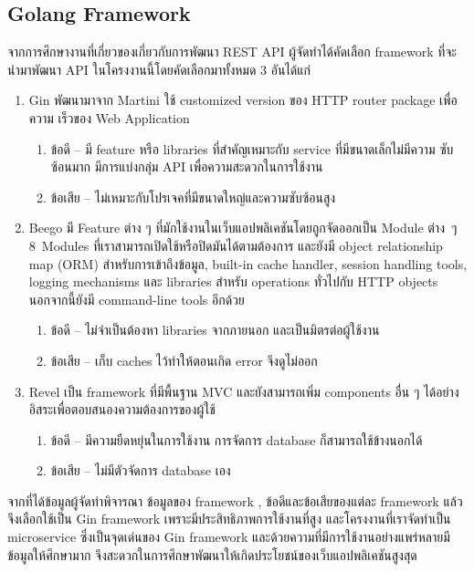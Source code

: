 \subsection{Golang Framework}
    จากการศึกษางานที่เกี่ยวของเกี่ยวกับการพัฒนา REST API ผู้จัดทำได้คัดเลือก 
framework ที่จะนำมาพัฒนา API ในโครงงานนี้โดยคัดเลือกมาทั้งหมด 3 อันได้แก่
\begin{enumerate}
    \item Gin พัฒนามาจาก Martini ใช้ customized version ของ HTTP router package 
เพื่อความ เร็วของ Web Application
        \begin{enumerate}
            \item ข้อดี – มี feature หรือ libraries ที่สำคัญเหมาะกับ service ที่มีขนาดเล็กไม่มีความ
ซับซ้อนมาก มีการแบ่งกลุ่ม API เพื่อความสะดวกในการใช้งาน
            \item ข้อเสีย – ไม่เหมาะกับโปรเจคที่มีขนาดใหญ่และความซับซ้อนสูง
        \end{enumerate}
        
    \item Beego มี Feature ต่าง ๆ ที่มักใช้งานในเว็บแอปพลิเคชันโดยถูกจัดออกเป็น 
Module \mbox{ต่าง ๆ} \mbox{8 Modules} ที่เราสามารถเปิดใช้หรือปิดมันได้ตามต้องการ และยังมี object relationship map (ORM) สำหรับการเข้าถึงข้อมูล, built-in cache handler, session handling tools, logging mechanisms และ libraries สำหรับ operations ทั่วไปกับ HTTP 
objects นอกจากนี้ยังมี command-line tools อีกด้วย
        \begin{enumerate}
            \item ข้อดี – ไม่จำเป็นต้องหา libraries จากภายนอก และเป็นมิตรต่อผู้ใช้งาน
            \item ข้อเสีย – เก็บ caches ไว้ทำให้ตอนเกิด error จึงดูไม่ออก
        \end{enumerate}

    \item Revel เป็น framework ที่มีพื้นฐาน MVC และยังสามารถเพิ่ม components อื่น ๆ 
ได้อย่างอิสระเพื่อตอบสนองความต้องการของผู้ใช้
        \begin{enumerate}
            \item ข้อดี – มีความยืดหยุ่นในการใช้งาน การจัดการ database ก็สามารถใช้ข้างนอกได้
            \item ข้อเสีย – ไม่มีตัวจัดการ database เอง
        \end{enumerate}
\end{enumerate}
จากที่ได้ข้อมูลผู้จัดทำพิจารณา ข้อมูลของ framework , ข้อดีและข้อเสียของแต่ละ framework แล้ว จึงเลือกใช้เป็น Gin framework เพราะมีประสิทธิภาพการใช้งานที่สูง และโครงงานที่เราจัดทำเป็น microservice ซึ่งเป็นจุดเด่นของ Gin framework และด้วยความที่มีการใช้งานอย่างแพร่หลายมีข้อมูลให้ศึกษามาก จึงสะดวกในการศึกษาพัฒนาให้เกิดประโยชน์ของเว็บแอปพลิเคชันสูงสุด
